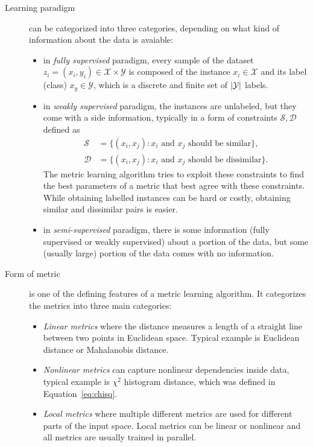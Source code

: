 \begin{description}
\item [Learning paradigm] can be categorized into three categories, depending on what kind of information about the data is avaiable:
\begin{itemize}
\item in \textit{fully supervised} paradigm, every sample of the dataset $z_i=(x_i,y_i) \in \mathcal{X} \times \mathcal{Y}$ is composed of the instance $x_i \in \mathcal{X}$ and its label (class) $x_y \in \mathcal{Y}$, which is a discrete and finite set of $\left|{\mathcal{Y}}\right|$ labels.
\item in \textit{weakly supervised} paradigm, the instances are unlabeled, but they come with a side information, typically in a form of constraints $\mathcal{S}, \mathcal{D}$ defined as %
\begin{align}
\mathcal{S} &= \lbrace(x_i,x_j): x_i \text{ and } x_j \text{ should be similar} \rbrace, \label{eq:similar} \\
\mathcal{D} &= \lbrace(x_i,x_j): x_i \text{ and } x_j \text{ should be dissimilar} \rbrace. \label{eq:dissimilar}
\end{align}
The metric learning algorithm tries to exploit these constraints to find the best parameters of a metric that best agree with these constraints. While obtaining labelled instances can be hard or costly, obtaining similar and dissimilar pairs is easier.
\item in \textit{semi-supervised} paradigm, there is some information (fully supervised or weakly supervised) about a portion of the data, but some (usually large) portion of the data comes with no information.
\end{itemize}

\item [Form of metric] is one of the defining features of a metric learning algorithm. It categorizes the metrics into three main categories: 
\begin{itemize}
\item \textit{Linear metrics} where the distance measures a length of a straight line between two points in Euclidean space. Typical example is Euclidean distance or Mahalanobis distance.
\item \textit{Nonlinear metrics} can capture nonlinear dependencies inside data, typical example is $\chi^2$ histogram distance, which was defined in Equation~\ref{eq:chisq}.
\item \textit{Local metrics} where multiple different metrics are used for different parts of the input space. Local metrics can be linear or nonlinear and all metrics are usually trained in parallel.
\end{itemize}


\end{description}
